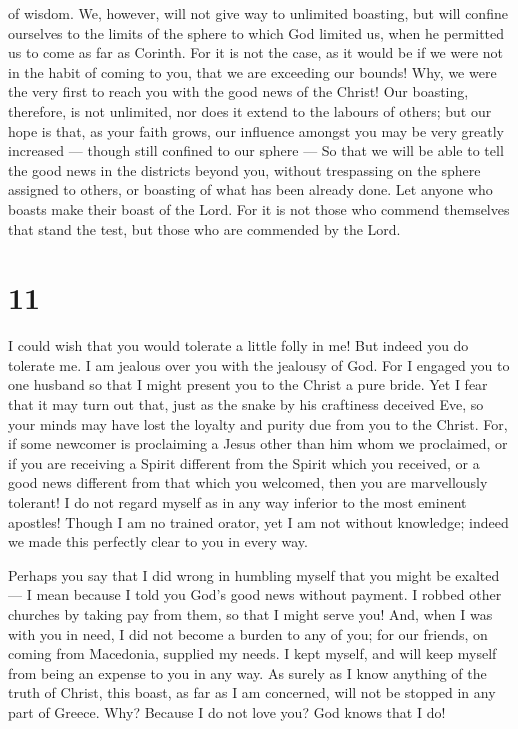 of wisdom.  We, however, will not give way to unlimited
boasting, but will confine ourselves to the limits of the sphere to
which God limited us, when he permitted us to come as far as Corinth.
 For it is not the case, as it would be if we were not in
the habit of coming to you, that we are exceeding our bounds! Why, we
were the very first to reach you with the good news of the Christ!
 Our boasting, therefore, is not unlimited, nor does it
extend to the labours of others; but our hope is that, as your faith
grows, our influence amongst you may be very greatly increased ---
though still confined to our sphere ---  So that we will be
able to tell the good news in the districts beyond you, without
trespassing on the sphere assigned to others, or boasting of what has
been already done.  Let anyone who boasts make their boast
of the Lord.  For it is not those who commend themselves
that stand the test, but those who are commended by the Lord.

\hypertarget{section-9}{%
\section{11}\label{section-9}}

 I could wish that you would tolerate a little folly in me!
But indeed you do tolerate me.  I am jealous over you with
the jealousy of God. For I engaged you to one husband so that I might
present you to the Christ a pure bride.  Yet I fear that it
may turn out that, just as the snake by his craftiness deceived Eve, so
your minds may have lost the loyalty and purity due from you to the
Christ.  For, if some newcomer is proclaiming a Jesus other
than him whom we proclaimed, or if you are receiving a Spirit different
from the Spirit which you received, or a good news different from that
which you welcomed, then you are marvellously tolerant!  I
do not regard myself as in any way inferior to the most eminent
apostles!  Though I am no trained orator, yet I am not
without knowledge; indeed we made this perfectly clear to you in every
way.

 Perhaps you say that I did wrong in humbling myself that
you might be exalted --- I mean because I told you God's good news
without payment.  I robbed other churches by taking pay from
them, so that I might serve you!  And, when I was with you
in need, I did not become a burden to any of you; for our friends, on
coming from Macedonia, supplied my needs. I kept myself, and will keep
myself from being an expense to you in any way.  As surely
as I know anything of the truth of Christ, this boast, as far as I am
concerned, will not be stopped in any part of Greece.  Why?
Because I do not love you? God knows that I do!

